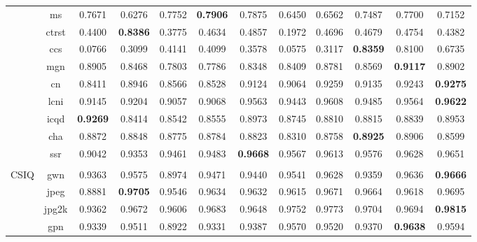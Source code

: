 \documentclass[11pt,a4paper]{article}
\begin{document}
\begin{table}[!htb]
\begin{scriptsize}
\begin{threeparttable}
\begin{tabular}{*{12}{c}}
				& ms & 0.7671 & 0.6276 & 0.7752 & \textbf{0.7906} & 0.7875 & 0.6450 & 0.6562 & 0.7487 & 0.7700 & 0.7152\\
				& ctrst & 0.4400 & \cellcolor{red!25}\textbf{0.8386} & 0.3775 & 0.4634 & 0.4857 & \cellcolor{green!25}0.1972 & 0.4696 & 0.4679 & 0.4754 & 0.4382\\
				& ccs & \cellcolor{green!25}0.0766 & \cellcolor{green!25}0.3099 & \cellcolor{green!25}0.4141 & \cellcolor{green!25}0.4099 & \cellcolor{green!25}0.3578 & \cellcolor{green!25}0.0575 & \cellcolor{green!25}0.3117 & \cellcolor{red!25}\textbf{0.8359} & \cellcolor{red!25}0.8100 & 0.6735\\
				& mgn & 0.8905 & 0.8468 & \cellcolor{green!25}0.7803 & \cellcolor{green!25}0.7786 & 0.8348 & 0.8409 & 0.8781 & 0.8569 & \textbf{0.9117} & 0.8902\\
				& cn & \cellcolor{green!25}0.8411 & 0.8946 & \cellcolor{green!25}0.8566 & \cellcolor{green!25}0.8528 & 0.9124 & 0.9064 & 0.9259 & 0.9135 & 0.9243 & \textbf{0.9275}\\
				& lcni & \cellcolor{green!25}0.9145 & \cellcolor{green!25}0.9204 & \cellcolor{green!25}0.9057 & \cellcolor{green!25}0.9068 & 0.9563 & 0.9443 & 0.9608 & 0.9485 & 0.9564 & \textbf{0.9622}\\
				& icqd & \textbf{0.9269} & 0.8414 & 0.8542 & 0.8555 & 0.8973 & 0.8745 & 0.8810 & 0.8815 & 0.8839 & 0.8953\\
				& cha & 0.8872 & 0.8848 & 0.8775 & 0.8784 & 0.8823 & 0.8310 & 0.8758 & \textbf{0.8925} & 0.8906 & 0.8599\\
				& ssr & \cellcolor{green!25}0.9042 & \cellcolor{green!25}0.9353 & 0.9461 & 0.9483 & \textbf{0.9668} & 0.9567 & 0.9613 & 0.9576 & 0.9628 & 0.9651\\
				\\
				\multirow{6}{*}{CSIQ} & gwn & \cellcolor{green!25}0.9363 & 0.9575 & \cellcolor{green!25}0.8974 & 0.9471 & \cellcolor{green!25}0.9440 & 0.9541 & 0.9628 & \cellcolor{green!25}0.9359 & 0.9636 & \textbf{0.9666}\\
				& jpeg & \cellcolor{green!25}0.8881 & \textbf{0.9705} & 0.9546 & 0.9634 & 0.9632 & 0.9615 & 0.9671 & 0.9664 & 0.9618 & 0.9695\\
				& jpg2k & \cellcolor{green!25}0.9362 & \cellcolor{green!25}0.9672 & \cellcolor{green!25}0.9606 & \cellcolor{green!25}0.9683 & \cellcolor{green!25}0.9648 & 0.9752 & 0.9773 & \cellcolor{green!25}0.9704 & \cellcolor{green!25}0.9694 & \textbf{0.9815}\\
				& gpn & \cellcolor{green!25}0.9339 & 0.9511 & \cellcolor{green!25}0.8922 & \cellcolor{green!25}0.9331 & 0.9387 & 0.9570 & 0.9520 & 0.9370 & \textbf{0.9638} & 0.9594\\

\end{tabular}
\end{threeparttable}
\end{scriptsize}
\end{table}
\end{document}
